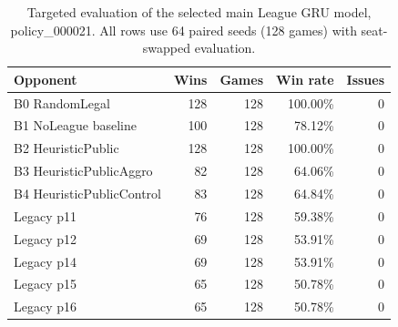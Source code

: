 \begin{table}[t]
\centering
\caption{Targeted evaluation of the selected main League GRU model, policy\_000021. All rows use 64 paired seeds (128 games) with seat-swapped evaluation.}
\label{tab:main-p21-targeted}
\begin{tabular}{lrrrr}
\toprule
Opponent & Wins & Games & Win rate & Issues \\
\midrule
B0 RandomLegal & 128 & 128 & 100.00\% & 0 \\
B1 NoLeague baseline & 100 & 128 & 78.12\% & 0 \\
B2 HeuristicPublic & 128 & 128 & 100.00\% & 0 \\
B3 HeuristicPublicAggro & 82 & 128 & 64.06\% & 0 \\
B4 HeuristicPublicControl & 83 & 128 & 64.84\% & 0 \\
Legacy p11 & 76 & 128 & 59.38\% & 0 \\
Legacy p12 & 69 & 128 & 53.91\% & 0 \\
Legacy p14 & 69 & 128 & 53.91\% & 0 \\
Legacy p15 & 65 & 128 & 50.78\% & 0 \\
Legacy p16 & 65 & 128 & 50.78\% & 0 \\
\bottomrule
\end{tabular}
\end{table}
